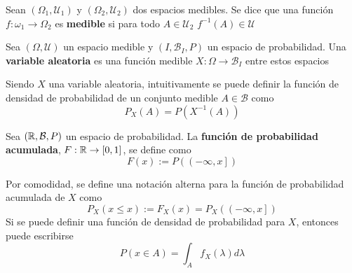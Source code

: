 \begin{definicion}
Sean $(\Omega_1,\mathcal{U}_1)$ y $(\Omega_2,\mathcal{U}_2)$ dos espacios medibles. Se dice que una función $f: \omega_1 \rightarrow \Omega_2$ es \textbf{medible} si para todo $A\in \mathcal{U}_2$
$f^{-1}(A)\in\mathcal{U}$
\end{definicion}

\begin{definicion}
Sea $(\Omega,\mathcal{U})$ un espacio medible y $(I,\mathcal{B}_I,P)$ un espacio de probabilidad. Una \textbf{variable aleatoria} es una función medible $X: \Omega \rightarrow \mathcal{B}_I$ entre estos espacios
\end{definicion}

Siendo $X$ una variable aleatoria, intuitivamente se puede definir la función de densidad de probabilidad de un conjunto medible $A \in \mathcal{B}$ como
\begin{equation}
P_X(A) = P\left( X^{-1} \left( A \right) \right)
\end{equation}



\begin{definicion}%
Sea $(\mathbb{R},\mathcal{B},P)$ un espacio de probabilidad. La \textbf{función de probabilidad acumulada}, $F : \mathbb{R} \rightarrow [0,1]$, se define como
\begin{equation*}
F (x) := P\left( \left(-\infty,x \right] \right)
\end{equation*}
\end{definicion}

Por comodidad, se define una notación alterna para la función de probabilidad acumulada de $X$ como
\begin{equation}
P_X(x\leq x) := F_X(x) = P_X\left( \left( -\infty,x \right] \right)
\end{equation}
Si se puede definir una función de densidad de probabilidad para $X$, entonces puede escribirse
\begin{equation}
P(x\in A) = \int_A f_X(\lambda) d\lambda 
\end{equation}

